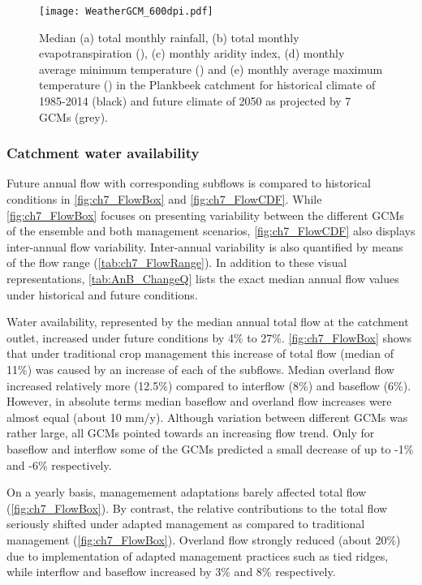 \begin{figure}[tbhp]
	\centering
		\texttt{[image: WeatherGCM\_600dpi.pdf]}
	\caption{Median (a) total monthly rainfall, (b) total monthly evapotranspiration (\ETo), (c) monthly aridity index, (d) monthly average minimum temperature (\Tmin) and (e) monthly average maximum temperature (\Tmax) in the Plankbeek catchment for historical climate of 1985-2014 (black) and  future climate of 2050 as projected by 7 GCMs (grey).}
	\label{fig:ch7_weatherGCM}
\end{figure} 

\subsubsection{Catchment water availability}
Future annual flow with corresponding subflows is compared to historical conditions in \autoref{fig:ch7_FlowBox} and \autoref{fig:ch7_FlowCDF}. While \autoref{fig:ch7_FlowBox} focuses on presenting variability between the different GCMs of the ensemble and both management scenarios, \autoref{fig:ch7_FlowCDF} also displays inter-annual flow variability. Inter-annual variability is also quantified by means of the flow range (\autoref{tab:ch7_FlowRange}). In addition to these visual representations, \autoref{tab:AnB_ChangeQ} lists the exact median annual flow values under historical and future conditions. 

Water availability, represented by the median annual total flow at the catchment outlet, increased under future conditions by 4\% to 27\%. \autoref{fig:ch7_FlowBox} shows that under traditional crop management this increase of total flow (median of 11\%) was caused by an increase of each of the subflows. Median overland flow increased relatively more (12.5\%) compared to interflow (8\%) and baseflow (6\%). However, in absolute terms median baseflow and overland flow increases were almost equal (about 10 \si{mm/y}). Although variation between different GCMs was rather large, all GCMs pointed towards an increasing flow trend. Only for baseflow and interflow some of the GCMs predicted a small decrease of up to -1\% and -6\% respectively.

On a yearly basis, managemement adaptations barely affected total flow (\autoref{fig:ch7_FlowBox}). By contrast, the relative contributions to the total flow seriously shifted under adapted management as compared to traditional management (\autoref{fig:ch7_FlowBox}). Overland flow strongly reduced (about 20\%) due to implementation of adapted management practices such as tied ridges, while interflow and baseflow increased by 3\% and 8\% respectively. 

